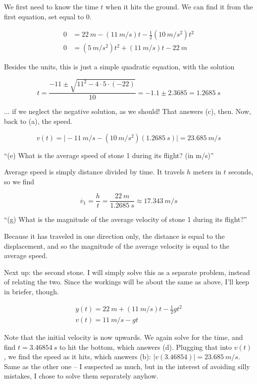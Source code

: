 \documentclass[8.01x]{subfiles}
\begin{document}
We first need to know the time $t$ when it hits the ground. We can find it from the first equation, set equal to 0.

\begin{align}
0 &= \SI{22}{m} - (\SI{11}{m/s}) t - \frac{1}{2} (\SI{10}{m/s^2}) t^2\\
0 &= (\SI{5}{m/s^2}) t^2 + (\SI{11}{m/s}) t - \SI{22}{m}
\end{align}

Besides the units, this is just a simple quadratic equation, with the solution 

\begin{equation}
t = \frac{-11 \pm \sqrt{11^2 - 4\cdot5\cdot(-22)}}{10} = -1.1 \pm 2.3685 = \SI{1.2685}{s}
\end{equation}

... if we neglect the negative solution, as we should! That answers (c), then. Now, back to (a), the speed.

\begin{equation}
v(t) = \Big|- \SI{11}{m/s} - (\SI{10}{m/s^2})(\SI{1.2685}{s})\Big| = \SI{23.685}{m/s}
\end{equation}

``(e) What is the average speed of stone 1 during its flight? (in m/s)''

Average speed is simply distance divided by time. It travels $h$ meters in $t$ seconds, so we find

\begin{equation}
\overbar{v}_1 = \frac{h}{t} = \frac{\SI{22}{m}}{\SI{1.2685}{s}} \approx \SI{17.343}{m/s}
\end{equation}

``(g) What is the magnitude of the average velocity of stone 1 during its flight?''

Because it has traveled in one direction only, the distance is equal to the displacement, and so the magnitude of the average velocity is equal to the average speed.

Next up: the second stone. I will simply solve this as a separate problem, instead of relating the two. Since the workings will be about the same as above, I'll keep in briefer, though.

\begin{align}
y(t) = \SI{22}{m} + (\SI{11}{m/s}) t - \frac{1}{2} g t^2\\
v(t) = \SI{11}{m/s} - g t
\end{align}

Note that the initial velocity is now upwards. We again solve for the time, and find $t = \SI{3.46854}{s}$ to hit the bottom, which answers (d). Plugging that into $v(t)$, we find the speed as it hits, which answers (b): $|v(3.46854)| = \SI{23.685}{m/s}$. Same as the other one -- I suspected as much, but in the interest of avoiding silly mistakes, I chose to solve them separately anyhow.
\end{document}
